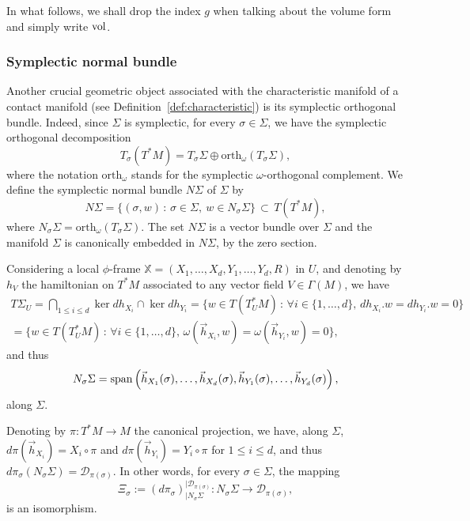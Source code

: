 \documentclass[12pt,a4paper]{amsart}
\theoremstyle{plain}
\theoremstyle{definition}
\theoremstyle{remark}
\numberwithin{equation}{section}
\theoremstyle{definition}
\def \cD{\mathcal{D}}
\def \bX{\mathbb{X}}
\numberwithin{equation}{section}
\begin{document}
In what follows, we shall drop the index $g$ when talking about the volume form and simply write ${\rm vol}$.


\subsubsection{Symplectic normal bundle}
\label{subsubsect:symnormbundle}

Another crucial geometric object associated with the characteristic manifold of a contact manifold (see Definition~\ref{def:characteristic}) is its symplectic orthogonal bundle. Indeed, since $ \Sigma$  is symplectic, for every $\sigma\in\Sigma$, we have the symplectic orthogonal decomposition
\begin{equation}\label{symplecticorthogonalsplitting}
T_\sigma(T^* M) = T_\sigma \Sigma \oplus \mathrm{orth}_\omega(T_\sigma \Sigma) ,
\end{equation}
where the notation $\mathrm{orth}_\omega$ stands for the symplectic $\omega$-orthogonal complement.
We define the symplectic normal bundle $N\Sigma$ of $\Sigma$ by
$$
N\Sigma = \{ (\sigma,w)\,:\, \sigma\in\Sigma,\ w\in
N_\sigma\Sigma \} \,\subset\, T(T^* M),
$$
where
$N_\sigma\Sigma = \mathrm{orth}_\omega(T_\sigma \Sigma) $.
The set $N\Sigma$ is a vector bundle over $\Sigma$ and the manifold $\Sigma$ is canonically embedded in $N\Sigma$, by the zero section.  

Considering a local $\phi$-frame $\bX = (X_1,\dots,X_d,Y_1,\dots,Y_d,R)$ in $U$, and denoting by $h_V$ the hamiltonian on $T^*M$ associated to any vector field $V\in \Gamma(M)$, we have
\begin{multline*}
T\Sigma_U =\bigcap_{1\leq i \leq d} \ker dh_{X_i}\cap \ker dh_{Y_i} 
= \{ w\in T(T^*_U M)\,:\,\forall i \in\{1,\dots,d\},\, dh_{X_i}.w = dh_{Y_i}.w = 0 \}  \\
= \{ w\in T(T^*_U M) \,:\,\forall i \in\{1,\dots,d\},\, \omega(\vec h_{X_i},w) = \omega(\vec h_{Y_i},w) = 0 \},
\end{multline*}
and thus
\begin{equation*}%
N_\sigma\Sigma = {\rm span}\left( \vec h_{X_1}(\sigma),\dots,\vec h_{X_d}(\sigma), \vec h_{Y_1}(\sigma),\dots,\vec h_{Y_d}(\sigma)\right),
\end{equation*}
along $\Sigma$.

Denoting by $\pi:T^* M\rightarrow M$ the canonical projection, we have, along $\Sigma$, $d\pi(\vec h_{X_i}) = X_i\circ\pi$ and $d\pi(\vec h_{Y_i}) = Y_i\circ\pi$ for $1\leq i\leq d$, and
thus $d\pi_\sigma(N_\sigma\Sigma)  = \cD_{\pi(\sigma)}$. In other words, for every $\sigma\in\Sigma$, the mapping
\begin{equation}
\label{eq:defXi}
\Xi_\sigma := (d\pi_\sigma)_{\vert N_\sigma\Sigma}^{\vert \cD_{\pi(\sigma)}} : N_\sigma\Sigma\rightarrow \cD_{\pi(\sigma)},
\end{equation}
is an isomorphism. 
\end{document}
